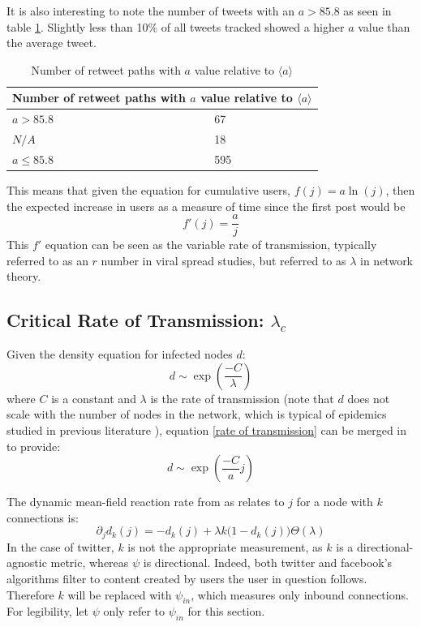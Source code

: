 \documentclass[preprint,review,12pt]{elsarticle}
\begin{document}
It is also interesting to note the number of tweets with an $a > 85.8$ as seen in table \ref{a > 85.58}. Slightly less than 10\% of all tweets tracked showed a higher $a$ value than the average tweet.
\begin{table}[h!]
\centering
\begin{tabular}{ |p{3cm}|p{3cm}|  }
\hline
\multicolumn{2}{|c|}{Number of retweet paths with $a$ value relative to $\langle a \rangle$} \\
\hline
$a > 85.8$  & 67\\
$N/A$ & 18 \\
$ a \leq 85.8$ & 595 \\
\hline
\end{tabular}
\caption{Number of retweet paths with $a$ value relative to $\langle a \rangle$}
\label{a > 85.58}
\end{table}

This means that given the equation for cumulative users, $f(j) = a \ln(j)$, then the expected increase in users as a measure of time since the first post would be 
\begin{equation}
\label{rate of transmission}
    f'(j) = \frac{a}{j} 
\end{equation}
This $f'$ equation can be seen as the variable rate of transmission, typically referred to as an $r$ number in viral spread studies, but referred to as $\lambda$ in network theory. 
\subsection{Critical Rate of Transmission: $\lambda_c$}

Given the density equation for infected nodes $d$: \begin{equation}
    \label{densityequation}
    d \sim \exp\left(\frac{ - C}{\lambda}\right)
\end{equation} where $C$ is a constant and $\lambda$ is the rate of transmission \citep{pastor2001epidemic} (note that $d$ does not scale with the number of nodes in the network, which is typical of epidemics studied in previous literature \citep{marro2005nonequilibrium}), equation \ref{rate of transmission} can be merged in to provide:
\begin{equation}
    d \sim \exp\left(\frac{ - C}{a}j\right)
\end{equation}


The dynamic mean-field reaction rate from \citep{marro2005nonequilibrium} as relates to $j$ for a node with $k$ connections is: 
\begin{equation}
\label{dynamic mean-field reaction rate}
    \partial_jd_k(j) = - d_k(j) + \lambda k \big(1 - d_k(j)\big)\Theta(\lambda)
\end{equation}
In the case of twitter, $k$ is not the appropriate measurement, as $k$ is a directional-agnostic metric, whereas $\psi$ is directional. Indeed, both twitter and facebook's algorithms filter to content created by users the user in question follows. Therefore $k$ will be replaced with $\psi_{in}$, which measures only inbound connections. For legibility, let $\psi$ only refer to $\psi_{in}$ for this section.
\end{document}
